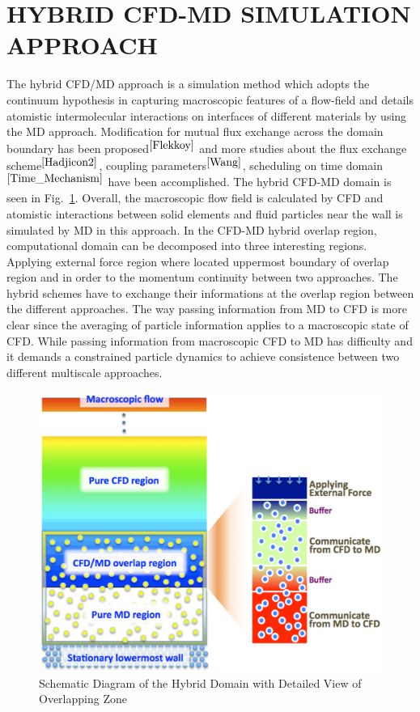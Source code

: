 \documentclass{CFD2010paper}
\begin{document}
\section{HYBRID CFD-MD SIMULATION APPROACH}


The hybrid CFD/MD approach is a simulation method which adopts the continuum hypothesis in capturing macroscopic features of a flow-field and details atomistic intermolecular interactions on interfaces of different materials by using the MD approach. Modification for mutual flux exchange across the domain boundary has been proposed$^{\cite{Flekkoy}}$ and more studies about the flux exchange scheme$^{\cite{Hadjicon2}}$, coupling parameters$^{\cite{Wang}}$, scheduling on time domain$^{\cite{Time_Mechanism}}$ have been accomplished.
The hybrid CFD-MD domain is seen in Fig.~\ref{Fig:Couette}. Overall, the macroscopic flow field is calculated by CFD and atomistic interactions between solid elements and fluid particles near the wall is simulated by MD in this approach. In the CFD-MD hybrid overlap region, computational domain can be decomposed into three interesting regions. Applying external force region where located uppermost boundary of overlap region and in order to the momentum continuity between two approaches. The hybrid schemes have to exchange their informations at the overlap region between the different approaches. The way passing information from MD to CFD is more clear since the averaging of particle information applies to a macroscopic state of CFD. While passing information from macroscopic CFD to MD has difficulty and it demands a constrained particle dynamics to achieve consistence between two different multiscale approaches.

\begin{figure}
\centering
\includegraphics[width=0.6\linewidth]{Couette7.pdf}
\vskip-0.2cm
\caption{Schematic Diagram of the Hybrid Domain with Detailed View of Overlapping Zone}
\label{Fig:Couette}
\end{figure}
\end{document}
